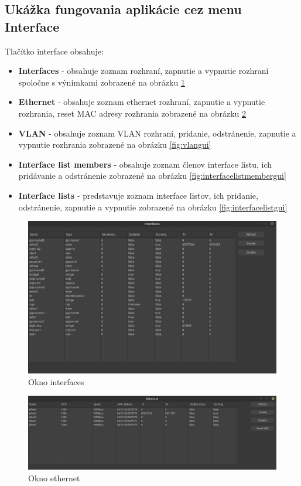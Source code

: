 \subsection{Ukážka fungovania aplikácie cez menu Interface}
Tlačítko interface obsahuje:
\begin{itemize}
\item \textbf{Interfaces} - obsahuje zoznam rozhraní, zapnutie a vypnutie rozhraní spoločne s výnimkami zobrazené na obrázku \ref{fig:interfacesgui} 
\item \textbf{Ethernet} - obsahuje zoznam ethernet rozhraní, zapnutie a vypnutie rozhrania, reset MAC adresy rozhrania zobrazené na obrázku \ref{fig:ethernet}
\item \textbf{VLAN} - obsahuje zoznam VLAN rozhraní, pridanie, odstránenie, zapnutie a vypnutie rozhrania zobrazené na obrázku \ref{fig:vlangui}
\item \textbf{Interface list members} - obsahuje zoznam členov interface listu, ich pridávanie a odstránenie zobrazené na obrázku \ref{fig:interfacelistmembergui}
\item \textbf{Interface lists} - predstavuje zoznam interface listov, ich pridanie, odstránenie, zapnutie a vypnutie zobrazené na obrázku \ref{fig:interfacelistgui}
\end{itemize}
\begin{figure}[H]
\centering
\includegraphics[scale=0.35]{../text/interfacesgui.png}
\caption{Okno interfaces}
\label{fig:interfacesgui}
\end{figure}
\begin{figure}[H]
\centering
\includegraphics[scale=0.35]{../text/ethernet.png}
\caption{Okno ethernet}
\label{fig:ethernet}
\end{figure}
